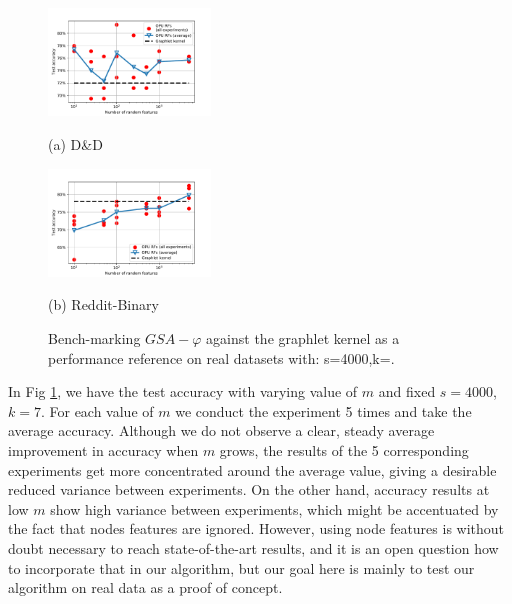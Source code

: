 \documentclass{article}
\begin{document}
\begin{figure}[h]
%
\begin{minipage}[b]{.48\linewidth}
  \centering
  \centerline{\includegraphics[width=4.3cm]{figs/DD.pdf}}
  \centerline{(a) D\&D }\medskip
  \label{subfig:RF_maps}
\end{minipage}
\hfill
\begin{minipage}[b]{0.48\linewidth}
  \centering
  \centerline{\includegraphics[width=4.3cm]{figs/Reddit.pdf}}
  \centerline{(b) Reddit-Binary}\medskip
\end{minipage}
%
\caption{Bench-marking $GSA-\varphi$ against the graphlet kernel as a performance reference on real datasets with: s=4000,k=.}
\label{fig:DD}
%
\end{figure}
In Fig \ref{fig:DD}, we have the test accuracy with varying value of $m$ and fixed $s=4000$, $k=7$. For each value of $m$ we conduct the experiment 5 times and take the average accuracy. Although we do not observe a clear, steady average improvement in accuracy when $m$ grows, the results of the 5 corresponding experiments get more concentrated around the average value, giving a desirable reduced variance between experiments. On the other hand,  accuracy results at low $m$ show high variance between experiments, which might be accentuated by the fact that nodes features are ignored. However, using node features is without doubt necessary to reach state-of-the-art results, and it is an open question how to incorporate that in our algorithm, but our goal here is mainly to test our algorithm on real data as a proof of concept.


\end{document}
